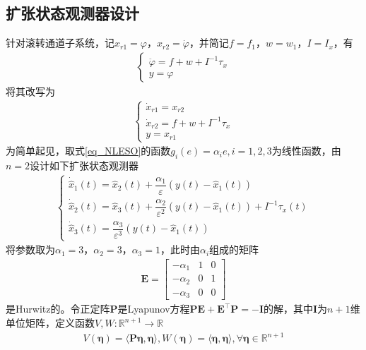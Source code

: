 \subsection{扩张状态观测器设计}	
针对滚转通道子系统，记$ x_{r1}=\varphi $，$ x_{r2}=\dot{\varphi} $，并简记$ f=f_1 $，$ w=w_1 $，$ I= I_{x}$，有
\begin{align}
\left\{\begin{array}{l}
\ddot{\varphi}=f +w+I^{-1} \tau_{x}	\\
{y}=\varphi
\end{array}\right.
\end{align}
将其改写为
\begin{align}
\left\{\begin{array}{l}
\dot{x}_{r1}=x_{r2} \\
\dot{x}_{r2}=f+w+I^{-1} \tau_{x} \\
y=x_{r1}
\end{array}\right.	\label{eq_roll_sys}
\end{align}
为简单起见，取式\eqref{eq_NLESO}的函数$ g_{i}(e)=\alpha_{i}e, i=1,2,3$为线性函数，由$ n=2 $设计如下扩张状态观测器
\begin{align}\left\{\begin{array}{l}
\dot{\hat{x}}_{1}(t)=\hat{x}_{2}(t)+\dfrac{\alpha_{1}}{\varepsilon}\left(y(t)-\hat{x}_{1}(t)\right) \\
\dot{\hat{x}}_{2}(t)=\hat{x}_{3}(t)+\dfrac{\alpha_{2}}{\varepsilon^{2}}\left(y(t)-\hat{x}_{1}(t)\right)+I^{-1} \tau_{x}(t) \\
\dot{\hat{x}}_{3}(t)=\dfrac{\alpha_{3}}{\varepsilon^{3}}\left(y(t)-\hat{x}_{1}(t)\right)	
\end{array}\right.	\label{eq_roll_ESO}
\end{align}
将参数取为$ \alpha_{1}=3 $，$ \alpha_{2}=3 $，$ \alpha_{3}=1 $，此时由$ \alpha_{i} $组成的矩阵
\begin{align}
\bm{E}=\begin{bmatrix}
-\alpha_{1} & 1 & 0  \\
-\alpha_{2} & 0 & 1  \\
-\alpha_{3} & 0 & 0 
\end{bmatrix}	\label{eq_roll_Hur}
\end{align}
是Hurwitz的。令正定阵$ \bm{P} $是Lyapunov方程$\bm{P} \bm{E}+\bm{E}^{\top} \bm{P}=-\bm{I}$的解，其中$ \bm{I} $为$ n+1 $维单位矩阵，定义函数$V, W: \mathbb{R}^{n+1} \rightarrow \mathbb{R}$
\begin{align}V(\bm{\eta})=\langle \bm{P} \bm{\eta}, \bm{\eta}\rangle, W(\bm{\eta})=\langle\bm{\eta}, \bm{\eta}\rangle, \forall \bm{\eta} \in \mathbb{R}^{n+1}\end{align}
